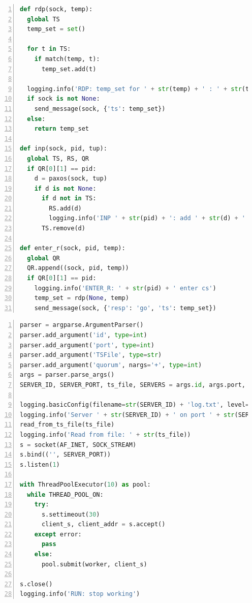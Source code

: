 \begin{ListingEnv}[p]\caption{Модуль~\texttt{BTS_server} (продолжение)}\label{list:server3}
	\begin{lstlisting}[language=Python, numbers=left]  
def rdp(sock, temp):
  global TS
  temp_set = set()

  for t in TS:
    if match(temp, t):
      temp_set.add(t)

  logging.info('RDP: temp_set for ' + str(temp) + ' : ' + str(temp_set))
  if sock is not None:
    send_message(sock, {'ts': temp_set})
  else:
    return temp_set
  
def inp(sock, pid, tup):
  global TS, RS, QR
  if QR[0][1] == pid:
    d = paxos(sock, tup)
    if d is not None:
      if d not in TS:
        RS.add(d)
        logging.info('INP ' + str(pid) + ': add ' + str(d) + ' to RS')
      TS.remove(d)

def enter_r(sock, pid, temp):
  global QR
  QR.append((sock, pid, temp))
  if QR[0][1] == pid:
    logging.info('ENTER_R: ' + str(pid) + ' enter cs')
    temp_set = rdp(None, temp)
    send_message(sock, {'resp': 'go', 'ts': temp_set})

	\end{lstlisting}
\end{ListingEnv}
\begin{ListingEnv}[p]\caption{Модуль~\texttt{BTS_server} (продолжение)}\label{list:server4}
\begin{lstlisting}[language=Python, numbers=left]
parser = argparse.ArgumentParser()
parser.add_argument('id', type=int)
parser.add_argument('port', type=int)
parser.add_argument('TSFile', type=str)
parser.add_argument('quorum', nargs='+', type=int)
args = parser.parse_args()
SERVER_ID, SERVER_PORT, ts_file, SERVERS = args.id, args.port, args.TSFile, args.quorum

logging.basicConfig(filename=str(SERVER_ID) + 'log.txt', level=logging.DEBUG, format="%(asctime)s - %(message)s")
logging.info('Server ' + str(SERVER_ID) + ' on port ' + str(SERVER_PORT))
read_from_ts_file(ts_file)
logging.info('Read from file: ' + str(ts_file))
s = socket(AF_INET, SOCK_STREAM)
s.bind(('', SERVER_PORT))
s.listen(1)

with ThreadPoolExecutor(10) as pool:
  while THREAD_POOL_ON:
    try:
      s.settimeout(30)
      client_s, client_addr = s.accept()
    except error:
      pass
    else:
      pool.submit(worker, client_s)

s.close()
logging.info('RUN: stop working')
	\end{lstlisting}
\end{ListingEnv}




